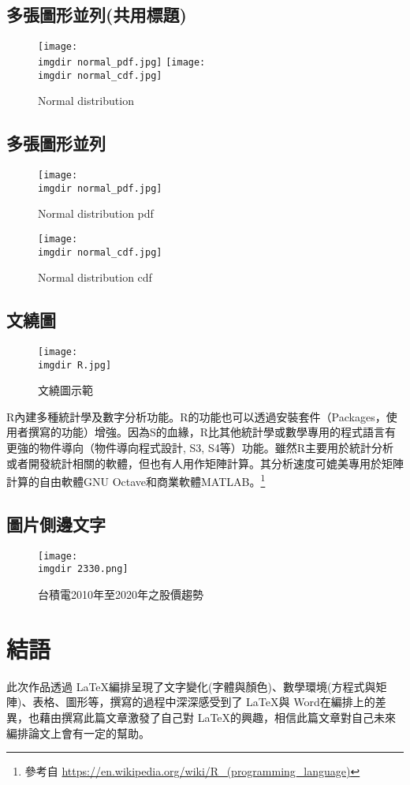 \subsection{多張圖形並列(共用標題)}
\begin{figure}[H]
\centering
\texttt{[image: \\imgdir normal\_pdf.jpg]}
\texttt{[image: \\imgdir normal\_cdf.jpg]}
\caption{Normal distribution}
\end{figure}
\subsection{多張圖形並列}
\begin{figure}[htbp]
\centering
\begin{minipage}[t]{0.48\textwidth}
\centering
\centerline{\texttt{[image: \\imgdir normal\_pdf.jpg]}}
\caption*{Normal distribution pdf}
\end{minipage}
\begin{minipage}[t]{0.48\textwidth}
\centering
\centerline{\texttt{[image: \\imgdir normal\_cdf.jpg]}}
\caption*{Normal distribution cdf}
\end{minipage}
\end{figure}
\subsection{文繞圖}
\begin{wrapfigure}{R}{0.4\textwidth}
\centering
\texttt{[image: \\imgdir R.jpg]}
\caption{文繞圖示範}\label{fig:R}
\end{wrapfigure}

R內建多種統計學及數字分析功能。R的功能也可以透過安裝套件（Packages，使用者撰寫的功能）增強。因為S的血緣，R比其他統計學或數學專用的程式語言有更強的物件導向（物件導向程式設計, S3, S4等）功能。雖然R主要用於統計分析或者開發統計相關的軟體，但也有人用作矩陣計算。其分析速度可媲美專用於矩陣計算的自由軟體GNU Octave和商業軟體MATLAB。\footnote{參考自 \url{https://en.wikipedia.org/wiki/R_(programming_language)}}
\subsection{圖片側邊文字}
\begin{SCfigure}[0.5][h]
\caption{台積電2010年至2020年之股價趨勢}
\texttt{[image: \\imgdir 2330.png]}
\label{fig:2330}
\end{SCfigure}
\section{結語}
此次作品透過  \LaTeX 編排呈現了文字變化(字體與顏色)、數學環境(方程式與矩陣)、表格、圖形等，撰寫的過程中深深感受到了 \LaTeX 與 Word在編排上的差異，也藉由撰寫此篇文章激發了自己對 \LaTeX 的興趣，相信此篇文章對自己未來編排論文上會有一定的幫助。
%